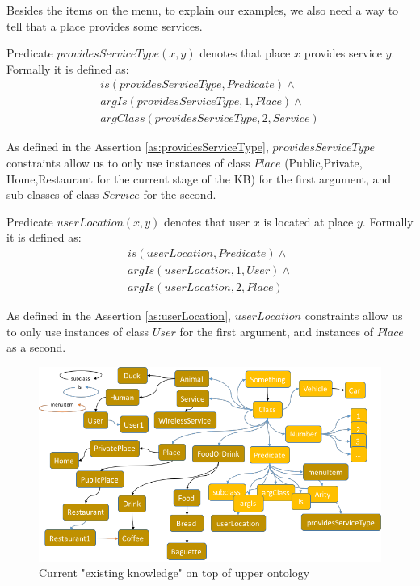 Besides the 
items on the menu, to explain our examples, we also need a way to tell that
a place provides some services.

\begin{definition}\label{def:serviceType}
Predicate $providesServiceType(x,y)$ denotes that place $x$ provides service 
$y$. Formally it is defined as:
\begin{equation}\label{as:providesServiceType}
\begin{gathered}
    is(providesServiceType,Predicate) \land \\
	argIs(providesServiceType,1,Place) \land\\
	argClass(providesServiceType,2, Service)
\end{gathered}
\end{equation}
\end{definition}
As defined in the Assertion \ref{as:providesServiceType}, $providesServiceType$
constraints allow us to only use instances of class $Place$ (Public,Private,
Home,Restaurant for the current stage of the KB) for the first argument, and 
sub-classes of class $Service$ for the second. 

\begin{definition}\label{def:userLocation}
Predicate $userLocation(x,y)$ denotes that user $x$ is located at place 
$y$. Formally it is defined as:
\begin{equation}\label{as:userLocation}
\begin{gathered}
    is(userLocation,Predicate) \land \\
	argIs(userLocation,1,User) \land\\
	argIs(userLocation,2, Place)
\end{gathered}
\end{equation}
\end{definition}
As defined in the Assertion \ref{as:userLocation}, $userLocation$
constraints allow us to only use instances of class $User$ for the first
argument, and instances of $Place$ as a second.

\begin{figure}[H]
	\centering
		\includegraphics[width=1\textwidth]{figures/fullExistingKB.png}
	\caption{Current "existing knowledge" on top of upper ontology}
	\label{fig:existingKB}
\end{figure}

